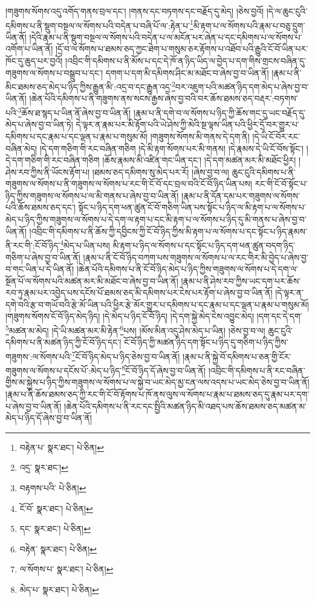 །གཟུགས་སོགས་འདུ་འགོད་གནས་བྲལ་དང་། །གནས་དང་བཏགས་དང་བརྗོད་དུ་མེད། །ཅེས་བྱའོ། །དེ་ལ་ཆུང་ངུའི་དམིགས་པ་ནི་སྡུག་བསྔལ་ལ་སོགས་པའི་བདེན་པ་བཞི་པོ་ལ་:རྟེན་པ་\footnote{བརྟེན་པ་  སྣར་ཐང་།  པེ་ཅིན། }མི་རྟག་པ་ལ་སོགས་པའི་རྣམ་པ་བཅུ་དྲུག་ཡིན་ནོ། །དེའི་རྣམ་པ་ནི་སྡུག་བསྔལ་ལ་སོགས་པའི་བདེན་པ་ལ་མངོན་པར་ཞེན་པ་དང་དམིགས་པ་ལ་སོགས་པ་འགོག་པ་ཡིན་ནོ། །དྲོ་བ་ལ་སོགས་པ་ཐམས་ཅད་ཀྱང་ཐེག་པ་གསུམ་ཅར་རྟོགས་པ་འཐོབ་པའི་རྒྱུའི་ངོ་བོ་ཡིན་པར་ཁོང་དུ་ཆུད་པར་བྱའོ། །འབྲིང་གི་དམིགས་པ་ནི་མོས་པ་དང་དེ་ཁོ་ན་ཉིད་ཡིད་ལ་བྱེད་པ་དག་གིས་གྲངས་བཞིན་དུ་གཟུགས་ལ་སོགས་པ་བསྒྲུབ་པ་དང་། དགག་པ་དག་མི་དམིགས་ཤིང་མ་མཐོང་བ་ཞེས་བྱ་བ་ཡིན་ནོ། །རྣམ་པ་ནི་མིང་ཐམས་ཅད་མེད་པ་ཉིད་ཀྱིས་རྒྱུན་མི་:འདྲ་བ་དང་རྒྱུན་འདྲ་\footnote{འདྲ་  སྣར་ཐང་། }བར་འཇུག་པའི་མཚན་ཉིད་དག་མེད་པ་ཞེས་བྱ་བ་ཡིན་ནོ། །ཆེན་པོའི་དམིགས་པ་ནི་གཟུགས་ནས་སངས་རྒྱས་ཞེས་བྱ་བའི་བར་ཆོས་ཐམས་ཅད་བརྡར་:བཏགས་པའི་\footnote{བརྟགས་པའི་  པེ་ཅིན། }ཆོས་ཐ་སྙད་པ་ཡིན་ནོ་ཞེས་བྱ་བ་ཡིན་ནོ། །རྣམ་པ་ནི་དགེ་བ་ལ་སོགས་པ་ཉིད་ཀྱི་ཆོས་གང་དུ་ཡང་བརྗོད་དུ་མེད་པ་ཞེས་བྱ་བ་ཡིན་ཏེ། དེ་ལྟར་ན་རྣམ་པར་མི་རྟོག་པའི་ཡེ་ཤེས་ཀྱི་མེའི་སྔ་ལྟས་ཡིན་པའི་ཕྱིར་དྲོ་བར་གྱུར་པ་དམིགས་པ་དང་རྣམ་པ་དང་ལྡན་པ་རྣམ་པ་གསུམ་མོ། །གཟུགས་སོགས་མི་གནས་དེ་དག་ནི། །དེ་ཡི་ངོ་བོར་རང་བཞིན་མེད། །དེ་དག་གཅིག་གི་རང་བཞིན་གཅིག །དེ་མི་རྟག་སོགས་པར་མི་གནས། །དེ་རྣམས་དེ་ཡི་ངོ་བོས་སྟོང་། །དེ་དག་གཅིག་གི་རང་བཞིན་གཅིག །ཆོས་རྣམས་མི་འཛིན་གང་ཡིན་དང་། །དེ་དག་མཚན་མར་མི་མཐོང་ཕྱིར། །ཤེས་རབ་ཀྱིས་ནི་ཡོངས་རྟོག་པ། །ཐམས་ཅད་དམིགས་སུ་མེད་པར་རོ། །ཞེས་བྱ་བ་ལ། ཆུང་ངུའི་དམིགས་པ་ནི་གཟུགས་ལ་སོགས་པ་ནི་གཟུགས་ལ་སོགས་པ་རང་གི་ངོ་བོ་དང་བྲལ་བའི་ངོ་བོ་ཉིད་ཡིན་པས། རང་གི་ངོ་བོ་སྟོང་པ་ཉིད་ཀྱིས་གཟུགས་ལ་སོགས་པ་ལ་མི་གནས་པ་ཞེས་བྱ་བ་ཡིན་ནོ། །རྣམ་པ་ནི་དོན་དམ་པར་གཟུགས་ལ་སོགས་པའི་ཆོས་ཐམས་ཅད་དང་། སྟོང་པ་ཉིད་དག་ཕན་ཚུན་ངོ་བོ་གཅིག་ཡིན་པས་སྟོང་པ་ཉིད་ལ་མི་རྟག་པ་ལ་སོགས་པ་མེད་པ་ཉིད་ཀྱིས་གཟུགས་ལ་སོགས་པ་དེ་དག་ལ་རྟག་པ་དང་མི་རྟག་པ་ལ་སོགས་པ་ཉིད་དུ་མི་གནས་པ་ཞེས་བྱ་བ་ཡིན་ནོ། །འབྲིང་གི་དམིགས་པ་ནི་ཆོས་ཀྱི་དབྱིངས་ཀྱི་ངོ་བོ་ཉིད་ཀྱིས་མི་རྟག་པ་ལ་སོགས་པ་དང་སྟོང་པ་ཉིད་རྣམས་ནི་རང་གི་:ངོ་བོ་ཉིད་\footnote{ངོ་བོ་  སྣར་ཐང་།  པེ་ཅིན། }མེད་པ་ཡིན་པས། མི་རྟག་པ་ཉིད་ལ་སོགས་པ་དང་སྟོང་པ་ཉིད་དག་ཕན་ཚུན་བདག་ཉིད་གཅིག་པ་ཞེས་བྱ་བ་ཡིན་ནོ། །རྣམ་པ་ནི་ངོ་བོ་ཉིད་བཀག་པས་གཟུགས་ལ་སོགས་པ་ལ་རང་གིར་མི་བྱེད་པ་ཞེས་བྱ་བ་གང་ཡིན་པ་དེ་ཡིན་ནོ། །ཆེན་པོའི་དམིགས་པ་ནི་ངོ་བོ་ཉིད་མེད་པ་ཉིད་ཀྱིས་གཟུགས་ལ་སོགས་པ་དེ་དག་ལ་སྔོན་པོ་ལ་སོགས་པའི་མཚན་མར་མི་མཐོང་བ་ཞེས་བྱ་བ་ཡིན་ནོ། །རྣམ་པ་ནི་ཤེས་རབ་ཀྱིས་ཡང་དག་པར་ཆོས་རབ་ཏུ་རྣམ་པར་འབྱེད་པས་དངོས་པོ་ཐམས་ཅད་མི་དམིགས་པར་ངེས་པར་རྟོག་པ་ཞེས་བྱ་བ་ཡིན་ནོ། །དེ་ལྟར་ན་དགེ་བའི་རྩ་བ་གཡོ་བའི་རྩེ་མོ་ཡིན་པའི་ཕྱིར་རྩེ་མོར་གྱུར་པ་དམིགས་པ་དང་རྣམ་པ་དང་ལྡན་པ་རྣམ་པ་གསུམ་མོ། །གཟུགས་སོགས་ངོ་བོ་ཉིད་མེད་ཉིད། །དེ་མེད་པ་ཉིད་ངོ་བོ་ཉིད། །དེ་དག་སྐྱེ་མེད་ངེས་འབྱུང་མེད། །དག་དང་དེ་དག་\footnote{དང་  སྣར་ཐང་།  པེ་ཅིན། }མཚན་མ་མེད། །དེ་ཡི་མཚན་མར་མི་རྟེན་\footnote{བརྟེན་  སྣར་ཐང་།  པེ་ཅིན། }པས། །མོས་མིན་འདུ་ཤེས་མེད་པ་ཡིན། །ཅེས་བྱ་བ་ལ། ཆུང་ངུའི་དམིགས་པ་ནི་མཚན་ཉིད་ཀྱི་ངོ་བོ་ཉིད་དང་། ངོ་བོ་ཉིད་ཀྱི་མཚན་ཉིད་དག་སྟོང་པ་ཉིད་དུ་གཅིག་པ་ཉིད་ཀྱིས་གཟུགས་:ལ་སོགས་པའི་\footnote{ལ་སོགས་པ་  སྣར་ཐང་།  པེ་ཅིན། }ངོ་བོ་ཉིད་མེད་པ་ཉིད་ཅེས་བྱ་བ་ཡིན་ནོ། །རྣམ་པ་ནི་སྐྱེ་བོ་དམིགས་པ་ཅན་གྱི་ངོར་གཟུགས་ལ་སོགས་པ་དངོས་པོ་:མེད་པ་ཉིད་\footnote{མེད་པ་  སྣར་ཐང་།  པེ་ཅིན། }ངོ་བོ་ཉིད་དོ་ཞེས་བྱ་བ་ཡིན་ནོ། །འབྲིང་གི་དམིགས་པ་ནི་རང་བཞིན་གྱིས་མ་སྐྱེས་པ་ཉིད་ཀྱིས་གཟུགས་ལ་སོགས་པ་ལ་སྐྱེ་བ་ཡང་མེད་མྱ་ངན་ལས་འདས་པ་ཡང་མེད་ཅེས་བྱ་བ་ཡིན་ནོ། །རྣམ་པ་ནི་ཆོས་ཐམས་ཅད་ཀྱི་རང་གི་ངོ་བོ་རྟོགས་པ་ཁོ་ནས་ལུས་ལ་སོགས་པ་རྣམ་པ་ཐམས་ཅད་དུ་རྣམ་པར་དག་པ་ཞེས་བྱ་བ་ཡིན་ནོ། །ཆེན་པོའི་དམིགས་པ་ནི་རང་དང་སྤྱིའི་མཚན་ཉིད་མི་འཐད་པས་ཆོས་ཐམས་ཅད་མཚན་མ་མེད་པ་ཉིད་དོ་ཞེས་བྱ་བ་ཡིན་ནོ། 